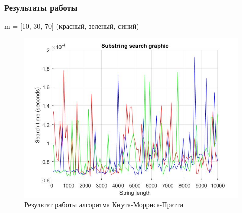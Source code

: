 \documentclass[12pt]{article}
\begin{document}
\subsubsection{Результаты работы}
m = [10, 30, 70] (красный, зеленый, синий)
\begin{figure}[h]
	\centering
	\includegraphics[width=0.8\linewidth]{KMP.jpg}
	\caption{Результат работы алгоритма Кнута-Морриса-Пратта}
\end{figure}
\end{document}
